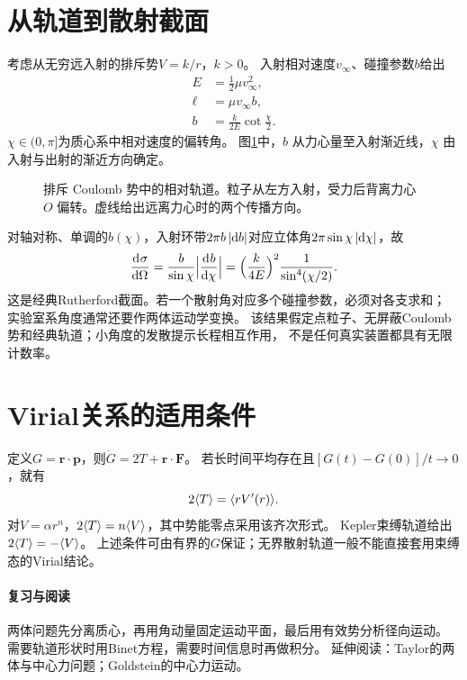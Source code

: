 \section{从轨道到散射截面}
考虑从无穷远入射的排斥势$V = k/r$，$k > 0$。
入射相对速度$v_\infty$、碰撞参数$b$给出
\begin{subequations}
 \begin{align}
  E &= \frac12\mu v_\infty^2,\\
  \ell &= \mu v_\infty b,\\
  b &= \frac{k}{2E}\cot\frac\chi2.
 \end{align}
\end{subequations}
$\chi \in (0,\pi]$为质心系中相对速度的偏转角。
图\ref{fig:rutherford-impact}中，$b$ 从力心量至入射渐近线，$\chi$ 由入射与出射的渐近方向确定。
\begin{figure}[htbp]
    \centering{}
    \caption{排斥 Coulomb 势中的相对轨道。粒子从左方入射，受力后背离力心 $O$ 偏转。虚线给出远离力心时的两个传播方向。}
    \label{fig:rutherford-impact}
\end{figure}
对轴对称、单调的$b(\chi)$，入射环带$2\pi b\,\lvert\mathop{}\!\mathrm{d} b\rvert$对应立体角$2\pi\sin\chi\,\lvert\mathop{}\!\mathrm{d}\chi\rvert$，故
\begin{equation}
 \frac{\mathop{}\!\mathrm{d}^{}\sigma}{\mathrm{d}{\Omega}^{}} = \frac{b}{\sin\chi}\Bigl\lvert\frac{\mathop{}\!\mathrm{d}^{}b}{\mathrm{d}{\chi}^{}}\Bigr\rvert
 = \Bigl(\frac{k}{4E}\Bigr)^2\frac1{\sin^4(\chi/2)}.
\end{equation}
这是经典Rutherford截面。若一个散射角对应多个碰撞参数，必须对各支求和；
实验室系角度通常还要作两体运动学变换。
该结果假定点粒子、无屏蔽Coulomb势和经典轨道；小角度的发散提示长程相互作用，
不是任何真实装置都具有无限计数率。

\section{Virial关系的适用条件}
定义$G = \bm r \cdot \bm p$，则$\dot G = 2T + \bm r \cdot \bm F$。
若长时间平均存在且$[G(t) - G(0)]/t \to 0$，就有
\begin{equation}
 2\langle T\rangle = \langle rV'(r)\rangle.
\end{equation}
对$V = \alpha r^n$，$2\langle T\rangle = n\langle V\rangle$，其中势能零点采用该齐次形式。
Kepler束缚轨道给出$2\langle T\rangle = -\langle V\rangle$。
上述条件可由有界的$G$保证；无界散射轨道一般不能直接套用束缚态的Virial结论。

\paragraph{复习与阅读}
两体问题先分离质心，再用角动量固定运动平面，最后用有效势分析径向运动。
需要轨道形状时用Binet方程，需要时间信息时再做积分。
延伸阅读：Taylor的两体与中心力问题；Goldstein的中心力运动。
